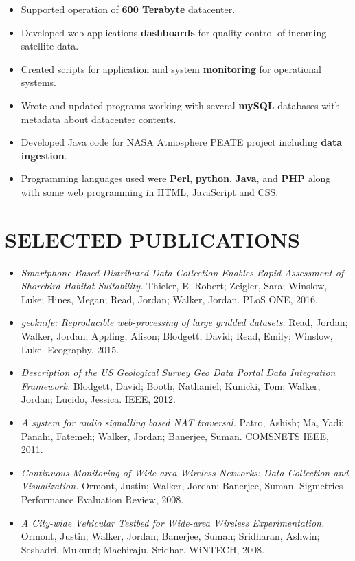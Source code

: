 \documentclass[line,margin]{res}
\begin{document}
\begin{resume}
	\begin{itemize} \itemsep -2pt %
		\item Supported operation of \textbf{600 Terabyte} datacenter.
		\item Developed web applications \textbf{dashboards} for quality control of incoming satellite data.
		\item Created scripts for application and system \textbf{monitoring} for operational systems. 
		\item Wrote and updated programs working with several \textbf{mySQL} databases with metadata about datacenter contents.
		\item Developed Java code for NASA Atmosphere PEATE project including \textbf{data ingestion}.
		\item Programming languages used were \textbf{Perl}, \textbf{python}, \textbf{Java}, and \textbf{PHP} along with some web programming in HTML, JavaScript and CSS.
	\end{itemize}

\section{SELECTED PUBLICATIONS}
	\begin{itemize} \itemsep -2pt
		\item {\sl Smartphone-Based Distributed Data Collection Enables Rapid Assessment of Shorebird Habitat Suitability.} Thieler, E. Robert; Zeigler, Sara; Winslow, Luke; Hines, Megan; Read, Jordan; Walker, Jordan. PLoS ONE, 2016.
		\item {\sl geoknife: Reproducible web-processing of large gridded datasets.} Read, Jordan; Walker, Jordan; Appling, Alison; Blodgett, David; Read, Emily; Winslow, Luke. Ecography, 2015.
		\item {\sl Description of the US Geological Survey Geo Data Portal Data Integration Framework.}  Blodgett, David; Booth, Nathaniel; Kunicki, Tom; Walker, Jordan; Lucido, Jessica. IEEE, 2012.
		\item {\sl A system for audio signalling based NAT traversal.} Patro, Ashish; Ma, Yadi; Panahi, Fatemeh; Walker, Jordan; Banerjee, Suman. COMSNETS IEEE, 2011.
		\item {\sl Continuous Monitoring of Wide-area Wireless Networks: Data Collection and Visualization.} Ormont, Justin; Walker, Jordan; Banerjee, Suman. Sigmetrics Performance Evaluation Review, 2008.
		\item {\sl A City-wide Vehicular Testbed for Wide-area Wireless Experimentation.} Ormont, Justin; Walker, Jordan; Banerjee, Suman; Sridharan, Ashwin; Seshadri, Mukund; Machiraju, Sridhar. WiNTECH, 2008.
	\end{itemize}


\end{resume}
\end{document}
